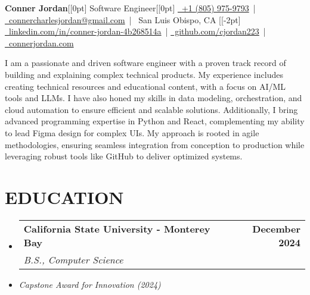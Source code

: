 \documentclass[letterpaper,10pt]{article}
\makeatletter
\newcommand{\resumeSubHeadingListStart}{\begin{itemize}[leftmargin=0in,label={}]}
\newcommand{\resumeSubHeadingListEnd}{\end{itemize}}
\newcommand{\resumeSubheading}[4]{%
  \vspace{-2pt}\item
  \begin{tabular*}{\textwidth}[t]{l@{\extracolsep{\fill}}r}
    \textbf{\large #1} & \textbf{\small #2} \\
    \textit{\large #3} & \textit{\small #4} \\
  \end{tabular*}\vspace{-2pt}
}
\makeatother
\begin{document}
\begin{center}
  {\Huge \textbf{Conner Jordan}}[[0pt]  %
  {\Large Software Engineer}[[0pt]  %
  \href{tel:+18059759793}{\faPhone\ +1 (805) 975-9793} \,|
  \href{mailto:connercharlesjordan@gmail.com}{\faEnvelope\ connercharlesjordan@gmail.com} \,|
  \faMapMarker\ San Luis Obispo, CA [[-2pt]  %
  \href{https://www.linkedin.com/in/conner-jordan-4b268514a/}{\faLinkedin\ linkedin.com/in/conner-jordan-4b268514a}
  \,|
  \href{https://github.com/cjordan223}{\faGithub\ github.com/cjordan223}
  \,|
  \href{https://connerjordan.com/}{\faGlobe\ connerjordan.com}
\end{center}

\vspace{4pt}  %

I am a passionate and driven software engineer with a proven track record of building and explaining complex technical products. My experience includes creating technical resources and educational content, with a focus on AI/ML tools and LLMs. I have also honed my skills in data modeling, orchestration, and cloud automation to ensure efficient and scalable solutions. Additionally, I bring advanced programming expertise in Python and React, complementing my ability to lead Figma design for complex UIs. My approach is rooted in agile methodologies, ensuring seamless integration from conception to production while leveraging robust tools like GitHub to deliver optimized systems.
\vspace{8pt}

\section{EDUCATION}
\vspace{8pt}  %
\resumeSubHeadingListStart
  \resumeSubheading
    {California State University - Monterey Bay}{December 2024}
    {B.S., Computer Science}{}
  \item \small{\textit{Capstone Award for Innovation (2024)}}
\resumeSubHeadingListEnd
\vspace{6pt}  %
\end{document}
